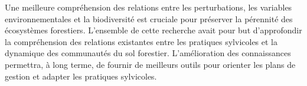 Une meilleure compréhension des relations entre les perturbations, les variables environnementales et la biodiversité est cruciale pour préserver la pérennité des écosystèmes forestiers. 
L’ensemble de cette recherche avait pour but d'approfondir la compréhension des relations existantes entre les pratiques sylvicoles et la dynamique des communautés du sol forestier. 
L'amélioration des connaissances permettra, à long terme, de fournir de meilleurs outils pour orienter les plans de gestion et adapter les pratiques sylvicoles.


\cleardoublepage




